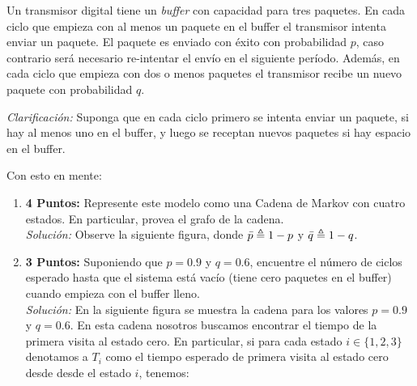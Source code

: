 \documentclass[ a4paper, twoside, 11pt]{article}
\begin{document}
\begin{problem}
Un transmisor digital tiene un \emph{buffer} con capacidad para tres paquetes. \linebreak En cada ciclo que empieza con al menos un paquete en el buffer el transmisor intenta enviar un paquete. El paquete es enviado con \'exito con probabilidad $p$, caso contrario ser\'a necesario re-intentar el env\'io en el siguiente per\'iodo. Adem\'as, en cada ciclo que empieza con dos o menos paquetes el transmisor recibe un nuevo paquete con probabilidad $q$. 

\emph{Clarificaci\'on:} Suponga que en cada ciclo primero se intenta enviar un paquete, si hay al menos uno en el buffer, y luego se receptan nuevos paquetes si hay espacio en el buffer. 

Con esto en mente: 
\begin{enumerate}[label=\textbf{\alph*)}]
\item \textbf{4 Puntos:} Represente este modelo como una Cadena de Markov con cuatro estados. \linebreak En particular, provea el grafo de la cadena. \\[1ex] \emph{Soluci\'on:} Observe la siguiente figura, donde $\bar{p} \triangleq 1-p$ y $\bar{q} \triangleq 1-q$. 

\begin{figure}[htb]
\centering
\def\svgwidth{0.9\columnwidth}

\end{figure}

\item \textbf{3 Puntos:} Suponiendo que $p = 0.9$ y $q = 0.6$, encuentre el n\'umero de ciclos esperado hasta que el sistema est\'a vac\'io (\ie tiene cero paquetes en el buffer) cuando empieza con el buffer lleno. \\[1ex] \emph{Soluci\'on:} En la siguiente figura se muestra la cadena para los valores $p = 0.9$ y $q = 0.6$. En esta cadena nosotros buscamos encontrar el tiempo de la primera visita al estado cero. En particular, si para cada estado $i \in \{ 1, 2, 3 \}$ denotamos a $T_i$ como el tiempo esperado de primera visita al estado cero desde desde el estado $i$, tenemos: 

\begin{figure}[htb]
\centering
\def\svgwidth{0.9\columnwidth}

\end{figure}


\end{enumerate}
\end{problem}
\end{document}
